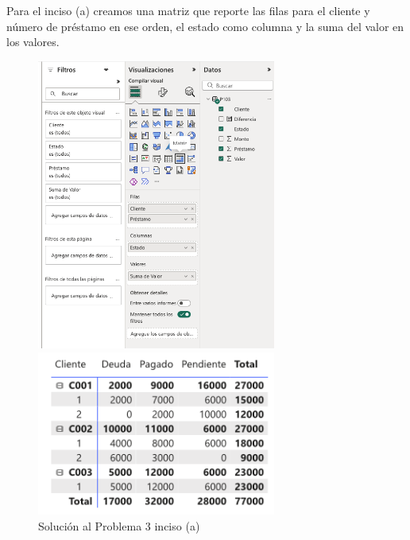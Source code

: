 \documentclass{article}
\begin{document}
Para el inciso (a) creamos una matriz que reporte las filas para el cliente y número de préstamo en ese orden, el estado como columna y la suma del valor en los valores.
\begin{figure}[!ht]
    \centering
    \begin{minipage}{\textwidth}
        \centering
        \includegraphics[width=0.7\textwidth]{figures/s103a-1.png}
    \end{minipage}
    \hfill
    \begin{minipage}{\textwidth}
        \centering
        \includegraphics[width=0.7\textwidth]{figures/s103a-2.png}
    \end{minipage}
    \captionsetup{width=0.9\textwidth}
    \caption{Solución al Problema 3 inciso (a)}
    \label{fig:s103a}
\end{figure}
\end{document}
